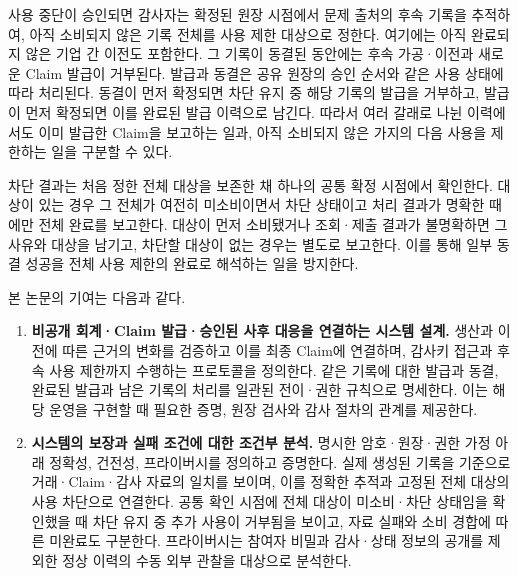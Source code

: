 \documentclass[11pt,a4paper]{article}
\begin{document}
사용 중단이 승인되면 감사자는 확정된 원장 시점에서 문제 출처의 후속 기록을 추적하여, 아직 소비되지 않은 기록 전체를 사용 제한 대상으로 정한다.
여기에는 아직 완료되지 않은 기업 간 이전도 포함한다.
그 기록이 동결된 동안에는 후속 가공·이전과 새로운 Claim 발급이 거부된다.
발급과 동결은 공유 원장의 승인 순서와 같은 사용 상태에 따라 처리된다.
동결이 먼저 확정되면 차단 유지 중 해당 기록의 발급을 거부하고, 발급이 먼저 확정되면 이를 완료된 발급 이력으로 남긴다.
따라서 여러 갈래로 나뉜 이력에서도 이미 발급한 Claim을 보고하는 일과, 아직 소비되지 않은 가지의 다음 사용을 제한하는 일을 구분할 수 있다.

차단 결과는 처음 정한 전체 대상을 보존한 채 하나의 공통 확정 시점에서 확인한다.
대상이 있는 경우 그 전체가 여전히 미소비이면서 차단 상태이고 처리 결과가 명확한 때에만 전체 완료를 보고한다.
대상이 먼저 소비됐거나 조회·제출 결과가 불명확하면 그 사유와 대상을 남기고, 차단할 대상이 없는 경우는 별도로 보고한다.
이를 통해 일부 동결 성공을 전체 사용 제한의 완료로 해석하는 일을 방지한다.

본 논문의 기여는 다음과 같다.
\begin{enumerate}
    \item \textbf{비공개 회계·Claim 발급·승인된 사후 대응을 연결하는 시스템 설계.}
          생산과 이전에 따른 근거의 변화를 검증하고 이를 최종 Claim에 연결하며, 감사키 접근과 후속 사용 제한까지 수행하는 프로토콜을 정의한다.
          같은 기록에 대한 발급과 동결, 완료된 발급과 남은 기록의 처리를 일관된 전이·권한 규칙으로 명세한다.
          이는 해당 운영을 구현할 때 필요한 증명, 원장 검사와 감사 절차의 관계를 제공한다.
    \item \textbf{시스템의 보장과 실패 조건에 대한 조건부 분석.}
          명시한 암호·원장·권한 가정 아래 정확성, 건전성, 프라이버시를 정의하고 증명한다.
          실제 생성된 기록을 기준으로 거래·Claim·감사 자료의 일치를 보이며, 이를 정확한 추적과 고정된 전체 대상의 사용 차단으로 연결한다.
          공통 확인 시점에 전체 대상이 미소비·차단 상태임을 확인했을 때 차단 유지 중 추가 사용이 거부됨을 보이고, 자료 실패와 소비 경합에 따른 미완료도 구분한다.
          프라이버시는 참여자 비밀과 감사·상태 정보의 공개를 제외한 정상 이력의 수동 외부 관찰을 대상으로 분석한다.
\end{enumerate}

\clearpage
\end{document}
